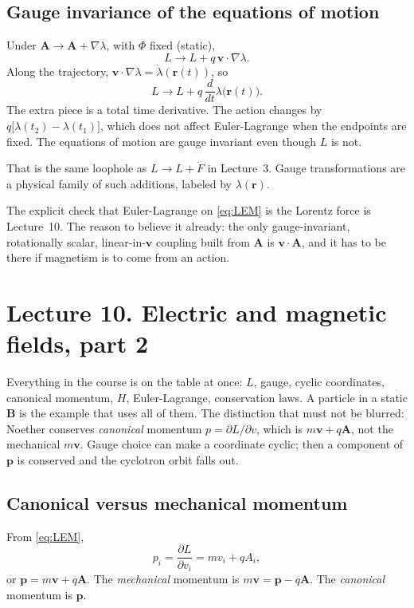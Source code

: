 \documentclass[11pt]{article}
\numberwithin{equation}{section}
\newcommand{\ddt}{\frac{d}{dt}}
\newcommand{\pd}[2]{\frac{\partial #1}{\partial #2}}
\newcommand{\vect}[1]{\mathbf{#1}}
\begin{document}
\subsection{Gauge invariance of the equations of motion}

Under $\vect{A}\to\vect{A}+\nabla\lambda$, with $\Phi$ fixed (static),
\[
L \to L + q\,\vect{v}\cdot\nabla\lambda.
\]
Along the trajectory, $\vect{v}\cdot\nabla\lambda=\dot\lambda(\vect{r}(t))$, so
\[
L \to L + q\,\ddt\lambda\bigl(\vect{r}(t)\bigr).
\]
The extra piece is a total time derivative. The action changes by $q\bigl[\lambda(t_2)-\lambda(t_1)\bigr]$, which does not affect Euler-Lagrange when the endpoints are fixed. The equations of motion are gauge invariant even though $L$ is not.

That is the same loophole as $L\to L+\dot F$ in Lecture~3. Gauge transformations are a physical family of such additions, labeled by $\lambda(\vect{r})$.

The explicit check that Euler-Lagrange on \eqref{eq:LEM} is the Lorentz force is Lecture~10. The reason to believe it already: the only gauge-invariant, rotationally scalar, linear-in-$\vect{v}$ coupling built from $\vect{A}$ is $\vect{v}\cdot\vect{A}$, and it has to be there if magnetism is to come from an action.

\section{Lecture 10. Electric and magnetic fields, part 2}

Everything in the course is on the table at once: $L$, gauge, cyclic coordinates, canonical momentum, $H$, Euler-Lagrange, conservation laws. A particle in a static $\vect{B}$ is the example that uses all of them. The distinction that must not be blurred: Noether conserves \emph{canonical} momentum $p=\partial L/\partial v$, which is $m\vect{v}+q\vect{A}$, not the mechanical $m\vect{v}$. Gauge choice can make a coordinate cyclic; then a component of $\vect{p}$ is conserved and the cyclotron orbit falls out.

\subsection{Canonical versus mechanical momentum}

From \eqref{eq:LEM},
\begin{equation}
\label{eq:pcan}
p_i = \pd{L}{v_i} = m v_i + q A_i,
\end{equation}
or $\vect{p}=m\vect{v}+q\vect{A}$. The \emph{mechanical} momentum is $m\vect{v}=\vect{p}-q\vect{A}$. The \emph{canonical} momentum is $\vect{p}$.
\end{document}
